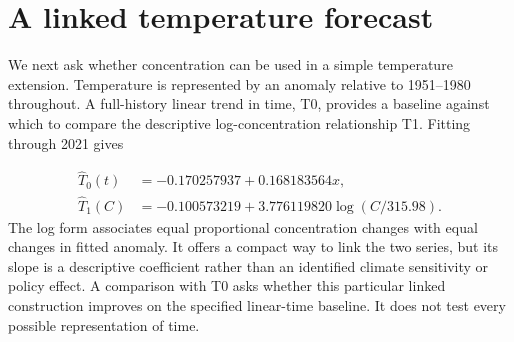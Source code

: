 \documentclass[11pt,a4paper]{article}
\newcommand{\p}[2]{#2\par}
\begin{document}
\section{A linked temperature forecast}\label{sec:temperature}
\p{TEM01}{We next ask whether concentration can be used in a simple temperature extension. Temperature is represented by an anomaly relative to 1951--1980 throughout. A full-history linear trend in time, T0, provides a baseline against which to compare the descriptive log-concentration relationship T1. Fitting through 2021 gives}\nopagebreak
\begin{align}
\widehat T_0(t)&=-0.170257937+0.168183564x,\label{eq:t0}\\
\widehat T_1(C)&=-0.100573219+3.776119820\log(C/315.98).\label{eq:t1}
\end{align}
\p{TEM02}{The log form associates equal proportional concentration changes with equal changes in fitted anomaly. It offers a compact way to link the two series, but its slope is a descriptive coefficient rather than an identified climate sensitivity or policy effect. A comparison with T0 asks whether this particular linked construction improves on the specified linear-time baseline. It does not test every possible representation of time.}
\end{document}
